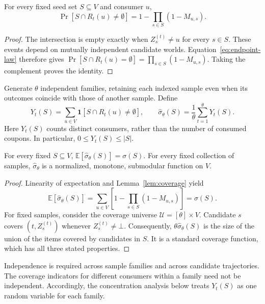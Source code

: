 \documentclass[sigconf]{acmart}
\begin{document}
\begin{lemma}
\label{lem:coverage}
For every fixed seed set $S\subseteq V$ and consumer $u$,
\begin{equation}
\label{eq:reverse-coverage}
 \Pr[S\cap R_t(u)\ne\emptyset]
 =1-\prod_{s\in S}(1-M_{u,s}).
\end{equation}
\end{lemma}
\begin{proof}\renewcommand{\qedsymbol}{}
The intersection is empty exactly when $Z_s^{(t)}\ne u$ for
every $s\in S$. These events depend on mutually independent
candidate worlds. Equation~\eqref{eq:endpoint-law} therefore gives
$\Pr[S\cap R_t(u)=\emptyset]=\prod_{s\in S}(1-M_{u,s})$.
Taking the complement proves the identity.
\end{proof}

Generate $\theta$ independent families, retaining each indexed
sample even when its outcomes coincide with those of another sample.
Define
\begin{equation}
\label{eq:empirical-spread}
 Y_t(S)=\sum_{u\in V}\mathbf1[S\cap R_t(u)\ne\emptyset],
 \qquad
 \hat\sigma_\theta(S)=\frac1\theta\sum_{t=1}^\theta Y_t(S).
\end{equation}
Here $Y_t(S)$ counts distinct consumers, rather than the number
of consumed coupons. In particular, $0\le Y_t(S)\le |S|$.

\begin{lemma}
\label{lem:unbiased}
For every fixed $S\subseteq V$,
$\mathbb E[\hat\sigma_\theta(S)]=\sigma(S)$.
For every fixed collection of samples, $\hat\sigma_\theta$ is a
normalized, monotone, submodular function on $V$.
\end{lemma}
\begin{proof}\renewcommand{\qedsymbol}{}
Linearity of expectation and Lemma~\ref{lem:coverage} yield
\[
 \mathbb E[\hat\sigma_\theta(S)]
 =\sum_{u\in V}\left[1-\prod_{s\in S}(1-M_{u,s})\right]
 =\sigma(S).
\]
For fixed samples, consider the coverage universe
$\mathcal U=[\theta]\times V$. Candidate $s$ covers
$(t,Z_s^{(t)})$ whenever $Z_s^{(t)}\ne\bot$.
Consequently, $\theta\hat\sigma_\theta(S)$ is the size of the
union of the items covered by candidates in $S$.
It is a standard coverage function, which has all three stated
properties.
\end{proof}

Independence is required across sample families and across
candidate trajectories. The coverage indicators for different
consumers within a family need not be independent. Accordingly,
the concentration analysis below treats $Y_t(S)$ as one random
variable for each family.
\end{document}
